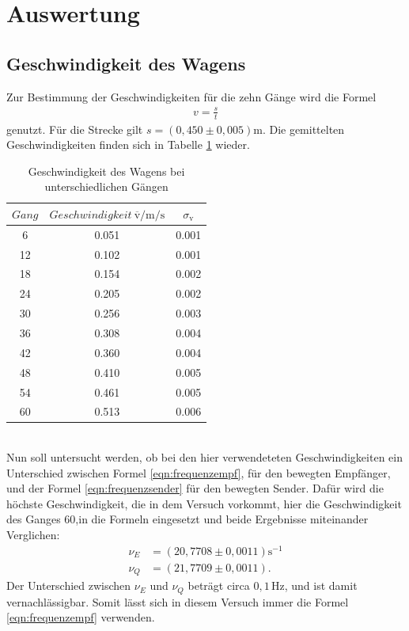 \section{Auswertung}
\label{sec:Auswertung}
\subsection{Geschwindigkeit des Wagens}
Zur Bestimmung der Geschwindigkeiten für die zehn Gänge wird die Formel
\begin{align}
  v=\frac{s}{t}
\end{align}
genutzt. Für die Strecke gilt $s=(0,450\pm0,005)$m.
Die gemittelten Geschwindigkeiten finden sich in Tabelle \ref{tab:v} wieder.
\begin{table}
  \centering
  \caption{Geschwindigkeit des Wagens bei unterschiedlichen Gängen}
  \label{tab:v}
  \begin{tabular}{c c c}
    \toprule
    $Gang$ & $Geschwindigkeit\ \overline{\text{v}}/\si{\meter\per\second}$ & $\sigma_{\text{v}}$\\
    \midrule
    6 &  0.051 & 0.001\\
    12 & 0.102 & 0.001\\
    18 & 0.154 & 0.002\\
    24 & 0.205 & 0.002\\
    30 & 0.256 & 0.003\\
    36 & 0.308 & 0.004\\
    42 & 0.360 & 0.004\\
    48 & 0.410 & 0.005\\
    54 & 0.461 & 0.005\\
    60 & 0.513 & 0.006\\
    \bottomrule
   \end{tabular}
\end{table}\\
Nun soll untersucht werden, ob bei den hier verwendeteten Geschwindigkeiten
ein Unterschied zwischen Formel \eqref{eqn:frequenzempf}, für den bewegten Empfänger,
und der Formel \eqref{eqn:frequenzsender} für den bewegten Sender.
Dafür wird die höchste Geschwindigkeit, die in dem Versuch vorkommt,
hier die Geschwindigkeit des Ganges 60,in die Formeln eingesetzt
und beide Ergebnisse miteinander Verglichen:
\begin{align}
  \nu_E&=(20,7708\pm0,0011)\si{\second\tothe{-1}}\\
  \nu_Q&=(21,7709\pm0,0011).
\end{align}
Der Unterschied zwischen $\nu_E$ und $\nu_Q$ beträgt circa $0,1\,\si{\hertz}$, und ist damit
vernachlässigbar. Somit lässt sich in diesem Versuch immer die Formel \eqref{eqn:frequenzempf}
verwenden.

